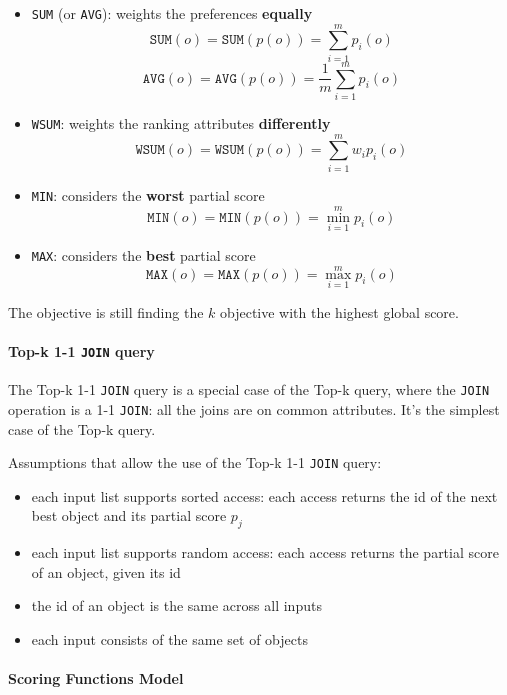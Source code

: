 \documentclass[english]{article}
\begin{document}
\begin{itemize}
  \item \texttt{SUM} (or \texttt{AVG}): weights the preferences \textbf{equally}
        \[ \texttt{SUM}(o) = \texttt{SUM}\left( p(o) \right) = \displaystyle\sum_{i=1}^m p_i(o) \]
        \[ \texttt{AVG}(o) = \texttt{AVG}\left( p(o) \right) = \frac{1}{m} \displaystyle\sum_{i=1}^m p_i(o) \]
  \item \texttt{WSUM}: weights the ranking attributes \textbf{differently}
        \[ \texttt{WSUM}(o) = \texttt{WSUM}\left( p(o) \right) = \displaystyle\sum_{i=1}^m w_i p_i(o) \]
  \item \texttt{MIN}: considers the \textbf{worst} partial score
        \[ \texttt{MIN}(o) = \texttt{MIN}\left( p(o) \right) = \min_{i=1}^m p_i(o) \]
  \item \texttt{MAX}: considers the \textbf{best} partial score
        \[ \texttt{MAX}(o) = \texttt{MAX}\left( p(o) \right) = \max_{i=1}^m p_i(o) \]
\end{itemize}

The objective is still finding the \(k\) objective with the highest global score.

\paragraph{Top-k 1-1 \texttt{JOIN} query}

The Top-k 1-1 \texttt{JOIN} query is a special case of the Top-k query, where the \texttt{JOIN} operation is a 1-1 \texttt{JOIN}:
all the joins are on common attributes.
It's the simplest case of the Top-k query.

Assumptions that allow the use of the \sql Top-k 1-1 \texttt{JOIN} query:

\begin{itemize}
  \item each input list supports sorted access: each access returns the id of the next best object and its partial score \(p_j\)
  \item each input list supports random access: each access returns the partial score of an object, given its id
  \item the id of an object is the same across all inputs
  \item each input consists of the same set of objects
\end{itemize}

\paragraph{Scoring Functions Model}
\end{document}
